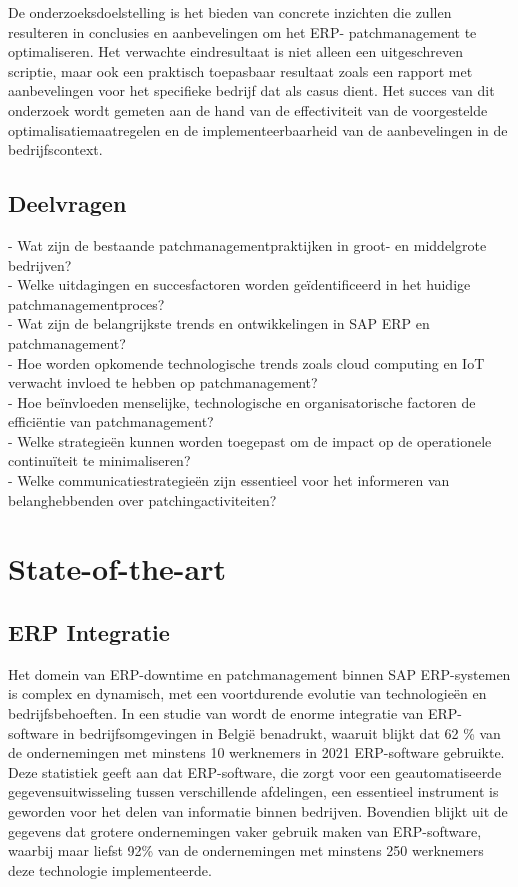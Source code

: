 De onderzoeksdoelstelling is het bieden van concrete inzichten die zullen resulteren in conclusies en aanbevelingen om het ERP- patchmanagement te optimaliseren. Het verwachte eindresultaat is niet alleen een uitgeschreven scriptie, maar ook een praktisch toepasbaar resultaat zoals een rapport met aanbevelingen voor het specifieke bedrijf dat als casus dient. Het succes van dit onderzoek wordt gemeten aan de hand van de effectiviteit van de voorgestelde optimalisatiemaatregelen en de implementeerbaarheid van de aanbevelingen in de bedrijfscontext.

\subsection{Deelvragen}
- Wat zijn de bestaande patchmanagementpraktijken in groot- en middelgrote bedrijven? \\
- Welke uitdagingen en succesfactoren worden geïdentificeerd in het huidige patchmanagementproces? \\
- Wat zijn de belangrijkste trends en ontwikkelingen in SAP ERP en patchmanagement? \\
- Hoe worden opkomende technologische trends zoals cloud computing en IoT verwacht invloed te hebben op patchmanagement? \\
- Hoe beïnvloeden menselijke, technologische en organisatorische factoren de efficiëntie van patchmanagement? \\
- Welke strategieën kunnen worden toegepast om de impact op de operationele continuïteit te minimaliseren? \\
- Welke communicatiestrategieën zijn essentieel voor het informeren van belanghebbenden over patchingactiviteiten? \\

\section{State-of-the-art}%
\label{sec:state-of-the-art}

\subsection{ERP Integratie}
Het domein van ERP-downtime en patchmanagement binnen SAP ERP-systemen is complex en dynamisch, met een voortdurende evolutie van technologieën en bedrijfsbehoeften. In een studie van \autocite{StatistiekVlaanderen2022} wordt de enorme integratie van ERP-software in bedrijfsomgevingen in België benadrukt, waaruit blijkt dat 62 \% van de ondernemingen met minstens 10 werknemers in 2021 ERP-software gebruikte. Deze statistiek geeft aan dat ERP-software, die zorgt voor een geautomatiseerde gegevensuitwisseling tussen verschillende afdelingen, een essentieel instrument is geworden voor het delen van informatie binnen bedrijven. Bovendien blijkt uit de gegevens dat grotere ondernemingen vaker gebruik maken van ERP-software, waarbij maar liefst 92\% van de ondernemingen met minstens 250 werknemers deze technologie implementeerde.

